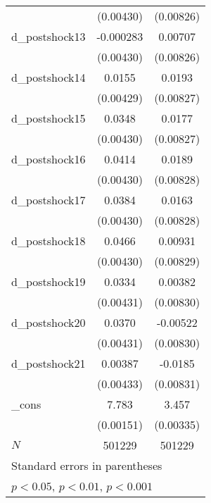 {\begin{tabular}{l*{2}{c}}
          &(0.00430)         &(0.00826)         \\
d\_postshock13&-0.000283         &  0.00707         \\
          &(0.00430)         &(0.00826)         \\
d\_postshock14&   0.0155\sym{***}&   0.0193\sym{*}  \\
          &(0.00429)         &(0.00827)         \\
d\_postshock15&   0.0348\sym{***}&   0.0177\sym{*}  \\
          &(0.00430)         &(0.00827)         \\
d\_postshock16&   0.0414\sym{***}&   0.0189\sym{*}  \\
          &(0.00430)         &(0.00828)         \\
d\_postshock17&   0.0384\sym{***}&   0.0163\sym{*}  \\
          &(0.00430)         &(0.00828)         \\
d\_postshock18&   0.0466\sym{***}&  0.00931         \\
          &(0.00430)         &(0.00829)         \\
d\_postshock19&   0.0334\sym{***}&  0.00382         \\
          &(0.00431)         &(0.00830)         \\
d\_postshock20&   0.0370\sym{***}& -0.00522         \\
          &(0.00431)         &(0.00830)         \\
d\_postshock21&  0.00387         &  -0.0185\sym{*}  \\
          &(0.00433)         &(0.00831)         \\
\_cons    &    7.783\sym{***}&    3.457\sym{***}\\
          &(0.00151)         &(0.00335)         \\
\hline
\(N\)     &   501229         &   501229         \\
\hline\hline
\multicolumn{3}{l}{\footnotesize Standard errors in parentheses}\\
\multicolumn{3}{l}{\footnotesize \sym{*} \(p<0.05\), \sym{**} \(p<0.01\), \sym{***} \(p<0.001\)}\\
\end{tabular}
}
